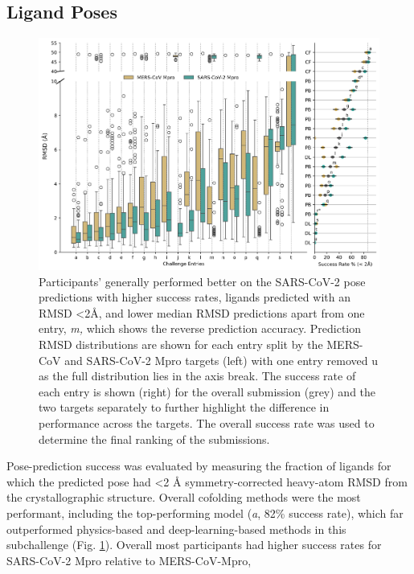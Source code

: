 \documentclass[journal=jcim,manuscript=article]{achemso}
\begin{document}
\subsection{Ligand Poses}

\begin{figure}
    \includegraphics[scale=0.15
    ]{04_figs_leaderboards/pose_comp.png}
  \caption{Participants' generally performed better on the SARS-CoV-2 pose predictions with higher success rates, ligands predicted with an RMSD \textless2Å, and lower median RMSD predictions apart from one entry, \textit{m,} which shows the reverse prediction accuracy. Prediction RMSD distributions are shown for each entry split by the MERS-CoV and SARS-CoV-2 Mpro targets (left) with one entry removed u as the full distribution lies in the axis break. The success rate of each entry is shown (right) for the overall submission (grey) and the two targets separately to further highlight the difference in performance across the targets. The overall success rate was used to determine the final ranking of the submissions.}
  \label{fgr:poses_leaderboard}
\end{figure}



Pose-prediction success was evaluated by measuring the fraction of ligands for which the predicted pose had \textless 2 Å symmetry-corrected heavy-atom RMSD from the crystallographic structure. Overall cofolding methods were the most performant, including the top-performing model (\textit{a}, 82\% success rate), which far outperformed physics-based and deep-learning-based methods in this subchallenge (Fig. \ref{fgr:poses_leaderboard}). Overall most participants had higher success rates for SARS-CoV-2 Mpro relative to MERS-CoV-Mpro, 
\end{document}

